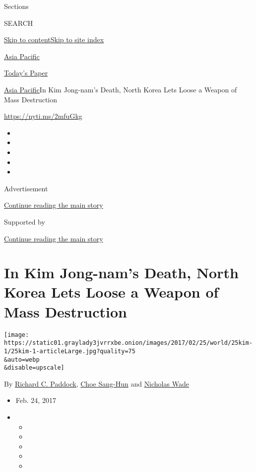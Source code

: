 Sections

SEARCH

\protect\hyperlink{site-content}{Skip to
content}\protect\hyperlink{site-index}{Skip to site index}

\href{https://www.nytimes3xbfgragh.onion/section/world/asia}{Asia
Pacific}

\href{https://myaccount.nytimes3xbfgragh.onion/auth/login?response_type=cookie\&client_id=vi}{}

\href{https://www.nytimes3xbfgragh.onion/section/todayspaper}{Today's
Paper}

\href{/section/world/asia}{Asia Pacific}\textbar{}In Kim Jong-nam's
Death, North Korea Lets Loose a Weapon of Mass Destruction

\url{https://nyti.ms/2mfuGkg}

\begin{itemize}
\item
\item
\item
\item
\item
\end{itemize}

Advertisement

\protect\hyperlink{after-top}{Continue reading the main story}

Supported by

\protect\hyperlink{after-sponsor}{Continue reading the main story}

\hypertarget{in-kim-jong-nams-death-north-korea-lets-loose-a-weapon-of-mass-destruction}{%
\section{In Kim Jong-nam's Death, North Korea Lets Loose a Weapon of
Mass
Destruction}\label{in-kim-jong-nams-death-north-korea-lets-loose-a-weapon-of-mass-destruction}}

\texttt{[image: https://static01.graylady3jvrrxbe.onion/images/2017/02/25/world/25kim-1/25kim-1-articleLarge.jpg?quality=75\\\&auto=webp\\\&disable=upscale]}

By
\href{https://www.nytimes3xbfgragh.onion/by/richard-c-paddock}{Richard
C. Paddock},
\href{http://www.nytimes3xbfgragh.onion/by/choe-sang-hun}{Choe Sang-Hun}
and \href{http://www.nytimes3xbfgragh.onion/by/nicholas-wade}{Nicholas
Wade}

\begin{itemize}
\item
  Feb. 24, 2017
\item
  \begin{itemize}
  \item
  \item
  \item
  \item
  \item
  \end{itemize}
\end{itemize}

